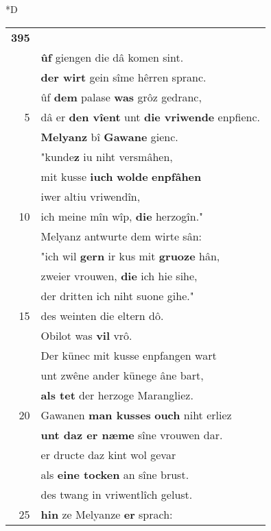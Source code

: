 \documentclass[8pt,a4paper,notitlepage]{article}
\begin{document}
\begin{table}[ht]
\begin{minipage}[t]{0.5\linewidth}
\small
\begin{center}*D
\end{center}
\begin{tabular}{rl}
\textbf{395} & \textbf{\textit{\begin{large}L\end{large}}yppaut}, sîn wîp, sîniu kint.\\ 
 & \textbf{ûf} giengen die dâ komen sint.\\ 
 & \textbf{der wirt} gein sîme hêrren spranc.\\ 
 & ûf \textbf{dem} palase \textbf{was} grôz gedranc,\\ 
5 & dâ er \textbf{den vîent} unt \textbf{die vriwende} enpfienc.\\ 
 & \textbf{Melyanz} bî \textbf{Gawane} gienc.\\ 
 & "kunde\textbf{z} iu niht versmâhen,\\ 
 & mit kusse \textbf{iuch} \textbf{wolde} \textbf{enpfâhen}\\ 
 & iwer altiu vriwendîn,\\ 
10 & ich meine mîn wîp, \textbf{die} herzogîn."\\ 
 & Melyanz antwurte dem wirte sân:\\ 
 & "ich wil \textbf{gern} ir kus mit \textbf{gruoze} hân,\\ 
 & zweier vrouwen, \textbf{die} ich hie sihe,\\ 
 & der dritten ich niht suone gihe."\\ 
15 & des weinten die eltern dô.\\ 
 & Obilot was \textbf{vil} vrô.\\ 
 & Der künec mit kusse enpfangen wart\\ 
 & unt zwêne ander künege âne bart,\\ 
 & \textbf{als tet} der herzoge Marangliez.\\ 
20 & Gawanen \textbf{man kusses} \textbf{ouch} niht erliez\\ 
 & \textbf{unt daz er næme} sîne vrouwen dar.\\ 
 & er dructe daz kint wol gevar\\ 
 & als \textbf{eine tocken} an sîne brust.\\ 
 & des twang in vriwentlîch gelust.\\ 
25 & \textbf{hin} ze Melyanze \textbf{er} sprach:\\ 

\end{tabular}
\end{minipage}
\end{table}
\end{document}
